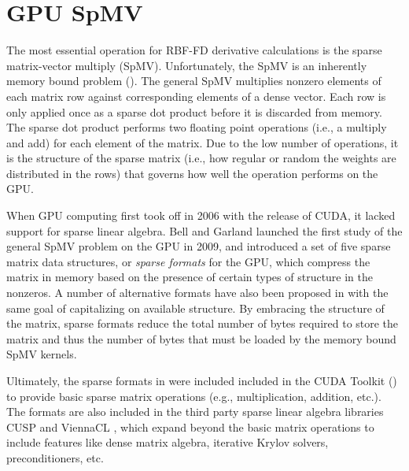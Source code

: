 \documentclass{report}
\begin{document}
\fi

\chapter{GPU SpMV}
\label{chap:gpu_rbffd}

The most essential operation for RBF-FD derivative calculations is the sparse matrix-vector multiply (SpMV). 
Unfortunately, the SpMV is an inherently memory bound problem (\cite{Bell2009, SuKeutzer2012, Kreutzer2012}). The general SpMV multiplies nonzero elements of each matrix row against corresponding elements of a dense vector. Each row is only applied once as a sparse dot product before it is discarded from memory. The sparse dot product performs two floating point operations (i.e., a multiply and add) for each element of the matrix. %
Due to the low number of operations, it is the structure of the sparse matrix (i.e., how regular or random the weights are distributed in the rows) that governs how well the operation performs on the GPU. %

When GPU computing first took off in 2006 with the release of CUDA, it lacked support for sparse linear algebra. Bell and Garland \cite{Bell2009} launched the first study of the general SpMV problem on the GPU in 2009, and introduced a set of five sparse matrix data structures, or \emph{sparse formats} for the GPU, which compress the matrix in memory based on the presence of certain types of structure in the nonzeros. 
A number of alternative formats have also been proposed in \cite{SuKeutzer2012,Kreutzer2012,LiSaad2010} with the same goal of capitalizing on available structure. By embracing the structure of the matrix, sparse formats reduce the total number of bytes required to store the matrix and thus the number of bytes that must be loaded by the memory bound SpMV kernels. 

Ultimately, the sparse formats in \cite{Bell2009} were included included in the CUDA Toolkit (\cite{CudaToolkitDoc}) to provide basic sparse matrix operations (e.g., multiplication, addition, etc.). The formats are also included in the third party sparse linear algebra libraries CUSP \cite{Cusp2012} and ViennaCL \cite{Rupp2010,Rupp2010a}, which expand beyond the basic matrix operations to include features like dense matrix algebra, iterative Krylov solvers, preconditioners, etc. 
\end{document}
